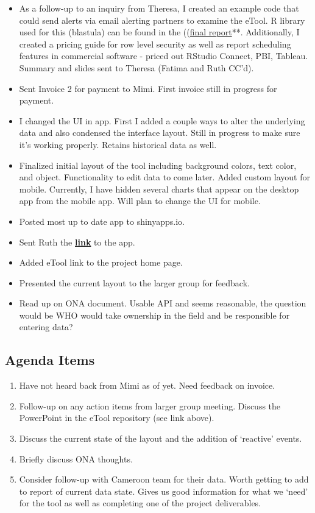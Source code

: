 \documentclass[]{article}
\providecommand{\tightlist}{%
  \setlength{\itemsep}{0pt}\setlength{\parskip}{0pt}}
\begin{document}
\begin{itemize}
\tightlist
\item
  As a follow-up to an inquiry from Theresa, I created an example code
  that could send alerts via email alerting partners to examine the
  eTool. R library used for this (blastula) can be found in the
  ((\href{https://paceafenet.github.io/final_report/}{final report}**.
  Additionally, I created a pricing guide for row level security as well
  as report scheduling features in commercial software - priced out
  RStudio Connect, PBI, Tableau. Summary and slides sent to Theresa
  (Fatima and Ruth CC'd).
\item
  Sent Invoice 2 for payment to Mimi. First invoice still in progress
  for payment.
\item
  I changed the UI in app. First I added a couple ways to alter the
  underlying data and also condensed the interface layout. Still in
  progress to make sure it's working properly. Retains historical data
  as well.
\item
  Finalized initial layout of the tool including background colors, text
  color, and object. Functionality to edit data to come later. Added
  custom layout for mobile. Currently, I have hidden several charts that
  appear on the desktop app from the mobile app. Will plan to change the
  UI for mobile.
\item
  Posted most up to date app to shinyapps.io.
\item
  Sent Ruth the
  \textbf{\href{https://travis-shinin-spot.shinyapps.io/etool_dev/}{link}}
  to the app.
\item
  Added eTool link to the project home page.
\item
  Presented the current layout to the larger group for feedback.
\item
  Read up on ONA document. Usable API and seems reasonable, the question
  would be WHO would take ownership in the field and be responsible for
  entering data?
\end{itemize}

\hypertarget{agenda-items-10}{%
\subsection{Agenda Items}\label{agenda-items-10}}

\begin{enumerate}
\def\labelenumi{\arabic{enumi}.}
\tightlist
\item
  Have not heard back from Mimi as of yet. Need feedback on invoice.
\item
  Follow-up on any action items from larger group meeting. Discuss the
  PowerPoint in the eTool repository (see link above).
\item
  Discuss the current state of the layout and the addition of `reactive'
  events.
\item
  Briefly discuss ONA thoughts.
\item
  Consider follow-up with Cameroon team for their data. Worth getting to
  add to report of current data state. Gives us good information for
  what we `need' for the tool as well as completing one of the project
  deliverables.
\end{enumerate}
\end{document}
